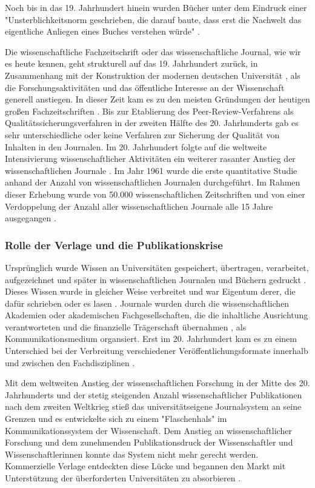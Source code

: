 Noch bis in das 19. Jahrhundert hinein wurden Bücher unter dem Eindruck einer "Unsterblichkeitsnorm geschrieben, die darauf baute, dass erst die Nachwelt das eigentliche Anliegen eines Buches verstehen würde" \cite{Hagner_2015}.

Die wissenschaftliche Fachzeitschrift oder das wissenschaftliche Journal, wie wir es heute kennen, geht strukturell auf das 19. Jahrhundert zurück, in Zusammenhang mit der Konstruktion der modernen deutschen Universität \cite{Paletschek_2002}, als die Forschungsaktivitäten und das öffentliche Interesse an der Wissenschaft generell anstiegen. In dieser Zeit kam es zu den meisten Gründungen der heutigen großen Fachzeitschriften \cite[:212]{Porter_1964}. Bis zur Etablierung des Peer-Review-Verfahrens als Qualitätssicherungsverfahren in der zweiten Hälfte des 20. Jahrhunderts gab es sehr unterschiedliche oder keine Verfahren zur Sicherung der Qualität von Inhalten in den Journalen. Im 20. Jahrhundert folgte auf die weltweite Intensivierung wissenschaftlicher Aktivitäten ein weiterer rasanter Anstieg der wissenschaftlichen Journale \cite[:23]{Haustein_2012}. Im Jahr 1961 wurde die erste quantitative Studie anhand der Anzahl von wissenschaftlichen Journalen durchgeführt. Im Rahmen dieser Erhebung wurde von 50.000 wissenschaftlichen Zeitschriften und von einer Verdoppelung der Anzahl aller wissenschaftlichen Journale alle 15 Jahre ausgegangen \cite{de_Solla_Price_1982}.

\subsubsection{Rolle der Verlage und die Publikationskrise}

Ursprünglich wurde Wissen an Universitäten gespeichert, übertragen, verarbeitet, aufgezeichnet und später in wissenschaftlichen Journalen und Büchern gedruckt \cite{Kittler_2004}. Dieses Wissen wurde in gleicher Weise verbreitet \cite{Hagner_2015} und war Eigentum derer, die dafür schrieben oder es lasen \cite{Weiner_2001}. Journale wurden durch die wissenschaftlichen Akademien oder akademischen Fachgesellschaften, die die inhaltliche Ausrichtung verantworteten und die finanzielle Trägerschaft übernahmen \cite{Weiner_2001}, als Kommunikationsmedium organsiert. Erst im 20. Jahrhundert kam es zu einem Unterschied bei der Verbreitung verschiedener Veröffentlichungsformate innerhalb und zwischen den Fachdisziplinen \cite{Hagner_2015}.

Mit dem weltweiten Anstieg der wissenschaftlichen Forschung in der Mitte des 20. Jahrhunderts und der stetig steigenden Anzahl wissenschaftlicher Publikationen nach dem zweiten Weltkrieg stieß das universitätseigene Journalsystem an seine Grenzen und es entwickelte sich zu einem "Flaschenhals" \cite{Weiner_2001} im Kommunikationssystem der Wissenschaft. Dem Anstieg an wissenschaftlicher Forschung und dem zunehmenden Publikationsdruck der Wissenschaftler und Wissenschaftlerinnen konnte das System nicht mehr gerecht werden. Kommerzielle Verlage entdeckten diese Lücke und begannen den Markt mit Unterstützung der überforderten Universitäten zu absorbieren \cite{Hirschi_2015}.

